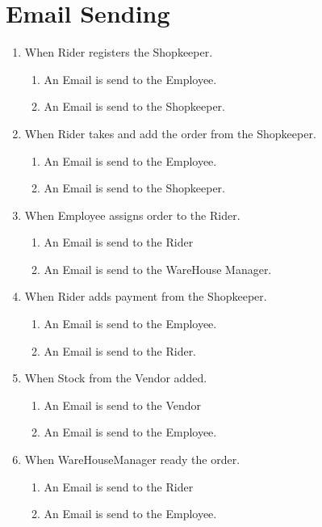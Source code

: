 \documentclass[12pt,a4paper]{article}
\begin{document}
\section{Email Sending}
\begin{enumerate}
\item When Rider registers the Shopkeeper.
 \begin{enumerate}
    \item An Email is send to the Employee.
    \item An Email is send to the Shopkeeper.
 \end{enumerate}

\item When Rider takes and add the order from the Shopkeeper.
 \begin{enumerate}
    \item An Email is send to the Employee.
    \item An Email is send to the Shopkeeper.
 \end{enumerate}

\item When Employee assigns order to the Rider.
 \begin{enumerate}
    \item An Email is send to the Rider
    \item An Email is send to the WareHouse Manager.
 \end{enumerate}

 \item When Rider adds payment from the Shopkeeper.
 \begin{enumerate}
    \item An Email is send to the Employee.
    \item An Email is send to the Rider.
 \end{enumerate}
 
 \item When Stock from the Vendor added.
 \begin{enumerate}
    \item An Email is send to the Vendor
    \item An Email is send to the Employee.
 \end{enumerate}

 \item When WareHouseManager ready the order.
 \begin{enumerate}
    \item An Email is send to the Rider
    \item An Email is send to the Employee.
 \end{enumerate}
 \end{enumerate}
\end{document}
